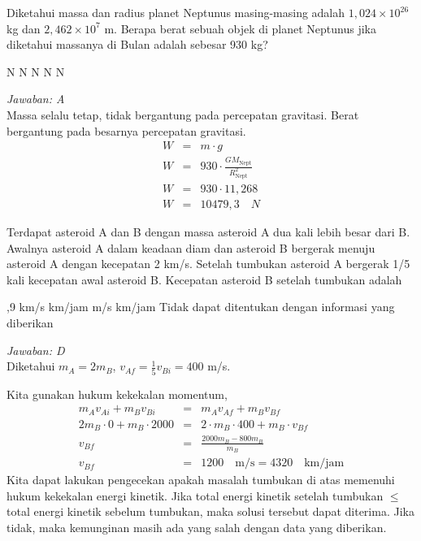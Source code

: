 \documentclass[11pt,fleqn, a4paper]{exam}
\begin{document}
\begin{questions}
\vspace{0.5cm}
\question Diketahui massa dan radius planet Neptunus masing-masing adalah $1,024 \times 10^{26}$ kg dan $2,462 \times 10^7$ m. Berapa berat sebuah objek di planet Neptunus jika diketahui massanya di Bulan adalah sebesar 930 kg?
\begin{choices}
 N 
 N
 N
 N
 N
\end{choices}

\textit{Jawaban: A}\\
Massa selalu tetap, tidak bergantung pada percepatan gravitasi. Berat bergantung pada besarnya percepatan gravitasi.
\begin{eqnarray*}
W &=& m \cdot g\\
W &=& 930 \cdot \frac{GM_{\text{Nept}}}{R_{\text{Nept}}^{2}}\\
W &=& 930 \cdot 11,268\\
W &=& 10479,3 \quad N  
\end{eqnarray*}
 

\vspace{0.5cm}
\question Terdapat asteroid A dan B dengan massa asteroid A dua kali lebih besar dari B. Awalnya asteroid A dalam keadaan diam dan asteroid B bergerak menuju asteroid A dengan kecepatan 2 km/s. Setelah tumbukan asteroid A bergerak 1/5 kali kecepatan awal asteroid B. Kecepatan asteroid B setelah tumbukan adalah
\begin{choices}
,9 km/s
 km/jam
 m/s
 km/jam
\choice Tidak dapat ditentukan dengan informasi yang diberikan
\end{choices}

\textit{Jawaban: D} \\
Diketahui $m_A = 2 m_B$, $v_{Af} = \frac{1}{5} v_{Bi} = 400$ m/s.

Kita gunakan hukum kekekalan momentum,
\begin{eqnarray*}
m_A v_{Ai} + m_B v_{Bi} &=& m_A v_{Af} + m_B v_{Bf}\\
2 m_B \cdot 0 + m_B \cdot 2000 &=& 2 \cdot m_B \cdot 400 + m_B \cdot v_{Bf}\\
v_{Bf} &=& \frac{2000 m_B - 800 m_B}{m_B}\\
v_{Bf} &=& 1200 \quad \text{m/s} = 4320 \quad \text{km/jam}
\end{eqnarray*}
Kita dapat lakukan pengecekan apakah masalah tumbukan di atas memenuhi hukum kekekalan energi kinetik. Jika total energi kinetik setelah tumbukan $\leq$ total energi kinetik sebelum tumbukan, maka solusi tersebut dapat diterima. Jika tidak, maka kemunginan masih ada yang salah dengan data yang diberikan.


\end{questions}
\end{document}
